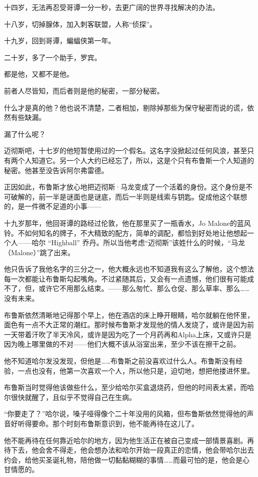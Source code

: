 \documentclass[../main]{subfiles}
\begin{document}
十四岁，无法再忍受哥谭一分一秒，去更广阔的世界寻找解决的办法。

十八岁，切掉腺体，加入刺客联盟，人称“侦探”。

十九岁，回到哥谭，蝙蝠侠第一年。

二十岁，多了一个助手，罗宾。

都是他，又都不是他。

前者人尽皆知，而后者则是他的秘密，一部分秘密。

什么才是真的他？他也说不清楚，二者相加，剔除掉那些为保守秘密而说的谎，依然有些缺漏。

漏了什么呢？

迈彻斯吧，十七岁的他短暂使用过的一个假名。这名字没掀起过任何风浪，甚至只有两个人知道它。另一个人大约已经忘了，所以，这是个只有布鲁斯一个人知道的秘密。他甚至没告诉阿尔弗雷德。

正因如此，布鲁斯才放心地把迈彻斯·马龙变成了一个活着的身份。这个身份是不可破解的，前一半是谜面也是谜底，而后一半则是线索与钥匙。促成他这个联想的，是一件微不足道的小事——

十九岁那年，他回哥谭的路经过伦敦，他在那里买了一瓶香水，Jo
Malone的蓝风铃。不如何知名的牌子，不大精致的配方，简单的调配，都恰到好处地让他想起一个人——哈尔
“Highball”
乔丹。所以当他考虑“迈彻斯”该姓什么的时候，“马龙（Malone）”跳了出来。

他只告诉了我他名字的三分之一，他大概永远也不知道我有这么了解他，这个想法每一次都能让布鲁斯勾起嘴角。不过紧随其后，又会有一点遗憾，他们很有可能成不了，但，或许它不用那么结束。——那么匆忙、那么仓促、那么草率、那么……没有未来。

布鲁斯依然清晰地记得那个早上，他在酒店的床上睁开眼睛，哈尔就躺在他怀里，面色有一点不大正常的潮红。那时候布鲁斯才发现他的情人发烧了，或许是因为前一天带着汗吹了半天冷风，或许是因为吃了一个月药再和Alpha上床，又或许只是因为晚上哪里做的不对——他们大概不该从浴室出来，至少不该在擦干之前。

他不知道哈尔发没发现，但他是……布鲁斯之前没喜欢过什么人。布鲁斯没有经验，一点也没有，他第一次喜欢一个人，所以他只是，迫切地，想把他搂进怀里。

布鲁斯当时觉得他该做些什么，至少给哈尔买盒退烧药，但他的时间表太紧，而哈尔很快就醒了，且似乎不觉得自己在生病。

“你要走了？”哈尔说，嗓子哑得像个二十年没用的风箱，但布鲁斯依然觉得他的声音好听得要命。那个时刻布鲁斯意识到，他不能再待在这儿了。

他不能再待在任何靠近哈尔的地方，因为他生活正在被自己变成一部情景喜剧。再待下去，他会舍不得走，他会想办法和哈尔开始一段真正的恋情，他会带哈尔出去约会，给他买圣诞礼物，陪他做一切黏黏糊糊的事情……而最可怕的是，他会是心甘情愿的。
\end{document}
